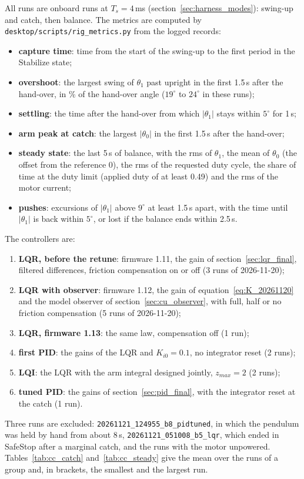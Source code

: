 \documentclass[a4paper,11pt]{article}
\begin{document}
All runs are onboard runs at $T_s = 4$\,ms (section~\ref{sec:harness_modes}): swing-up and catch, then balance. The metrics are computed by \nolinkurl{desktop/scripts/rig_metrics.py} from the logged records:
\begin{itemize}
  \item \textbf{capture time}: time from the start of the swing-up to the first period in the Stabilize state;
  \item \textbf{overshoot}: the largest swing of $\theta_1$ past upright in the first 1.5\,s after the hand-over, in \% of the hand-over angle ($19^\circ$ to $24^\circ$ in these runs);
  \item \textbf{settling}: the time after the hand-over from which $|\theta_1|$ stays within $5^\circ$ for 1\,s;
  \item \textbf{arm peak at catch}: the largest $|\theta_0|$ in the first 1.5\,s after the hand-over;
  \item \textbf{steady state}: the last 5\,s of balance, with the rms of $\theta_1$, the mean of $\theta_0$ (the offset from the reference 0), the rms of the requested duty cycle, the share of time at the duty limit (applied duty of at least 0.49) and the rms of the motor current;
  \item \textbf{pushes}: excursions of $|\theta_1|$ above $9^\circ$ at least 1.5\,s apart, with the time until $|\theta_1|$ is back within $5^\circ$, or lost if the balance ends within 2.5\,s.
\end{itemize}
The controllers are:
\begin{enumerate}
  \item \textbf{LQR, before the retune}: firmware 1.11, the gain of section~\ref{sec:lqr_final}, filtered differences, friction compensation on or off (3 runs of 2026-11-20);
  \item \textbf{LQR with observer}: firmware 1.12, the gain of equation~\ref{eq:K_20261120} and the model observer of section~\ref{sec:cu_observer}, with full, half or no friction compensation (5 runs of 2026-11-20);
  \item \textbf{LQR, firmware 1.13}: the same law, compensation off (1 run);
  \item \textbf{first PID}: the gains of the LQR and $K_{i0} = 0.1$, no integrator reset (2 runs);
  \item \textbf{LQI}: the LQR with the arm integral designed jointly, $z_{max} = 2$ (2 runs);
  \item \textbf{tuned PID}: the gains of section~\ref{sec:pid_final}, with the integrator reset at the catch (1 run).
\end{enumerate}
Three runs are excluded: \texttt{20261121\_124955\_b8\_pidtuned}, in which the pendulum was held by hand from about 8\,s, \texttt{20261121\_051008\_b5\_lqr}, which ended in SafeStop after a marginal catch, and the runs with the motor unpowered. Tables~\ref{tab:cc_catch} and~\ref{tab:cc_steady} give the mean over the runs of a group and, in brackets, the smallest and the largest run.
\end{document}
